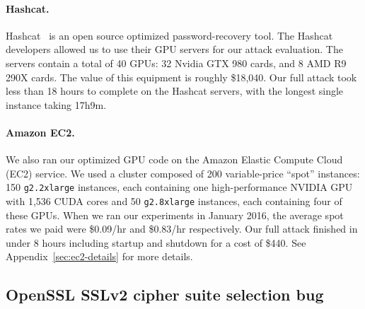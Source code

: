 \paragraph{Hashcat.}
Hashcat~\cite{hashcat} is an open source optimized password-recovery tool.
The Hashcat developers allowed us to use their GPU servers for our attack evaluation. 
The servers contain a total of 40 GPUs: 32 Nvidia GTX 980 cards, and 8 AMD R9 290X cards.
The value of this equipment is roughly \$18,040.
Our full attack took less than 18 hours to complete on the Hashcat servers, with the longest single instance taking 17h9m.


\paragraph{Amazon EC2.}
\label{sec:ec2_results}
\ifext

\else
We also ran our optimized GPU code on the Amazon Elastic Compute Cloud (EC2) service.  We used a cluster composed of 200 variable-price ``spot'' instances: 150 \texttt{g2.2xlarge} instances, each containing one high-performance NVIDIA GPU with 1,536 CUDA cores and 50 \texttt{g2.8xlarge} instances, each containing four of these GPUs.  
When we ran our experiments in January 2016, the average spot rates we paid were \$0.09/hr and \$0.83/hr respectively.  
Our full attack finished in under 8 hours including startup and shutdown for a cost of \$440.  
\ifext See Appendix~\ref{sec:ec2-details} for more details. \fi
\fi


\subsection{OpenSSL SSLv2 cipher suite selection bug}

